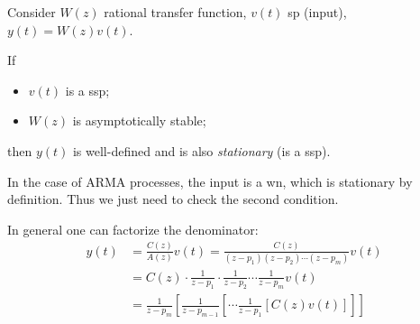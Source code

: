 Consider $W(z)$ rational transfer function, $v(t)$ \gls{sp} (input), $y(t)=W(z)v(t)$.

\begin{theorem}
	If
	\begin{itemize}
		\item $v(t)$ is a \gls{ssp};
		\item $W(z)$ is asymptotically stable;
	\end{itemize}
	then $y(t)$ is well-defined and is also \emph{stationary} (is a \gls{ssp}).
\end{theorem}

In the case of ARMA processes, the input is a \gls{wn}, which is stationary by definition. Thus we just need to check the second condition.

In general one can factorize the denominator:
\begin{align*}
	y(t)&=\frac{C(z)}{A(z)}v(t)=\frac{C(z)}{(z-p_{1})(z-p_{2})\cdots(z-p_{m})}v(t)\\
	&=C(z)\cdot\frac{1}{z-p_{1}}\cdot\frac{1}{z-p_{2}}\cdots\frac{1}{z-p_{m}}v(t)\\
	&=\frac{1}{z-p_{m}}\left[ \frac{1}{z-p_{m-1}}\left[ \cdots\frac{1}{z-p_{1}}\left[ C(z)v(t) \right]   \right]   \right]  
\end{align*}
\begin{figure}[htpb]
	\centering
\end{figure}
\FloatBarrier